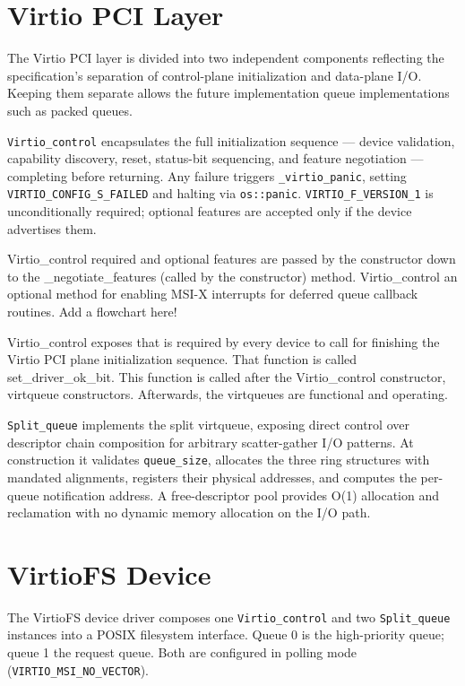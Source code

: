 \documentclass[12pt, a4paper, oneside]{report}
\begin{document}
\section{Virtio PCI Layer}
\label{sec:design-virtio}

The Virtio PCI layer is divided into two independent components reflecting the
specification's separation of control-plane initialization and data-plane I/O.
Keeping them separate allows the future implementation queue implementations such as packed queues.

\texttt{Virtio\_control} encapsulates the full initialization sequence ---
device validation, capability discovery, reset, status-bit sequencing, and
feature negotiation --- completing before returning.  Any failure triggers
\texttt{\_virtio\_panic}, setting \texttt{VIRTIO\_CONFIG\_S\_FAILED} and halting
via \texttt{os::panic}.  \texttt{VIRTIO\_F\_VERSION\_1} is unconditionally
required; optional features are accepted only if the device advertises them.

Virtio\_control required and optional features are passed by the constructor down to the \_negotiate\_features (called by the constructor) method. Virtio\_control an optional method for enabling MSI-X interrupts for deferred queue callback routines. Add a flowchart here!

Virtio\_control exposes that is required by every device to call for finishing the Virtio PCI plane initialization sequence. That function is called set\_driver\_ok\_bit. This function is called after the Virtio\_control constructor, virtqueue constructors. Afterwards, the virtqueues are functional and operating. 


\texttt{Split\_queue} implements the split virtqueue, exposing direct control
over descriptor chain composition for arbitrary scatter-gather I/O patterns.  At
construction it validates \texttt{queue\_size}, allocates the three ring
structures with mandated alignments, registers their physical addresses, and
computes the per-queue notification address.  A free-descriptor pool provides
O(1) allocation and reclamation with no dynamic memory allocation on the I/O
path.

\section{VirtioFS Device}
\label{sec:design-device}

The VirtioFS device driver composes one \texttt{Virtio\_control} and two
\texttt{Split\_queue} instances into a POSIX filesystem interface.  Queue 0 is
the high-priority queue; queue 1 the request queue.  Both are configured in
polling mode (\texttt{VIRTIO\_MSI\_NO\_VECTOR}).
\end{document}
